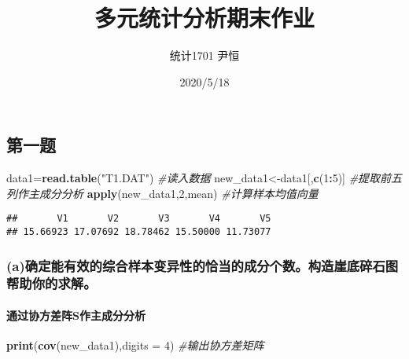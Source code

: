 \documentclass[
]{article}
\title{多元统计分析期末作业}
\author{统计1701 尹恒}
\date{2020/5/18}
\newenvironment{Shaded}{\begin{snugshade}}{\end{snugshade}}
\newcommand{\CommentTok}[1]{\textcolor[rgb]{0.56,0.35,0.01}{\textit{#1}}}
\newcommand{\DataTypeTok}[1]{\textcolor[rgb]{0.13,0.29,0.53}{#1}}
\newcommand{\DecValTok}[1]{\textcolor[rgb]{0.00,0.00,0.81}{#1}}
\newcommand{\KeywordTok}[1]{\textcolor[rgb]{0.13,0.29,0.53}{\textbf{#1}}}
\newcommand{\NormalTok}[1]{#1}
\newcommand{\OperatorTok}[1]{\textcolor[rgb]{0.81,0.36,0.00}{\textbf{#1}}}
\newcommand{\StringTok}[1]{\textcolor[rgb]{0.31,0.60,0.02}{#1}}
\begin{document}
\maketitle

\hypertarget{ux7b2cux4e00ux9898}{%
\subsection{第一题}\label{ux7b2cux4e00ux9898}}

\begin{Shaded}
\begin{Highlighting}[]
\NormalTok{data1=}\KeywordTok{read.table}\NormalTok{(}\StringTok{"T1.DAT"}\NormalTok{)   }\CommentTok{#读入数据}
\NormalTok{new_data1<-data1[,}\KeywordTok{c}\NormalTok{(}\DecValTok{1}\OperatorTok{:}\DecValTok{5}\NormalTok{)]    }\CommentTok{#提取前五列作主成分分析}
\KeywordTok{apply}\NormalTok{(new_data1,}\DecValTok{2}\NormalTok{,mean)    }\CommentTok{#计算样本均值向量}
\end{Highlighting}
\end{Shaded}

\begin{verbatim}
##       V1       V2       V3       V4       V5 
## 15.66923 17.07692 18.78462 15.50000 11.73077
\end{verbatim}

\hypertarget{aux786eux5b9aux80fdux6709ux6548ux7684ux7efcux5408ux6837ux672cux53d8ux5f02ux6027ux7684ux6070ux5f53ux7684ux6210ux5206ux4e2aux6570ux6784ux9020ux5d16ux5e95ux788eux77f3ux56feux5e2eux52a9ux4f60ux7684ux6c42ux89e3}{%
\subsubsection{(a)确定能有效的综合样本变异性的恰当的成分个数。构造崖底碎石图帮助你的求解。}\label{aux786eux5b9aux80fdux6709ux6548ux7684ux7efcux5408ux6837ux672cux53d8ux5f02ux6027ux7684ux6070ux5f53ux7684ux6210ux5206ux4e2aux6570ux6784ux9020ux5d16ux5e95ux788eux77f3ux56feux5e2eux52a9ux4f60ux7684ux6c42ux89e3}}

\hypertarget{ux901aux8fc7ux534fux65b9ux5deeux9635sux4f5cux4e3bux6210ux5206ux5206ux6790}{%
\paragraph{通过协方差阵S作主成分分析}\label{ux901aux8fc7ux534fux65b9ux5deeux9635sux4f5cux4e3bux6210ux5206ux5206ux6790}}

\begin{Shaded}
\begin{Highlighting}[]
\KeywordTok{print}\NormalTok{(}\KeywordTok{cov}\NormalTok{(new_data1),}\DataTypeTok{digits =} \DecValTok{4}\NormalTok{) }\CommentTok{#输出协方差矩阵}
\end{Highlighting}
\end{Shaded}
\end{document}
